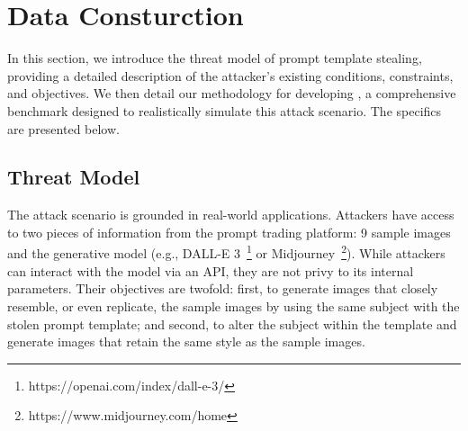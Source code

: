 

\section{Data Consturction}

In this section, we introduce the threat model of prompt template stealing, providing a detailed description of the attacker's existing conditions, constraints, and objectives. We then detail our methodology for developing \data, a comprehensive benchmark designed to realistically simulate this attack scenario.  The specifics are presented below.

\subsection{Threat Model} \label{sec_threat_model}
The attack scenario is grounded in real-world applications. Attackers have access to two pieces of information from the prompt trading platform: 9 sample images and the generative model (e.g., DALL-E 3~\footnote{https://openai.com/index/dall-e-3/} or Midjourney~\footnote{https://www.midjourney.com/home}). While attackers can interact with the model via an API, they are not privy to its internal parameters. Their objectives are twofold: first, to generate images that closely resemble, or even replicate, the sample images by using the same subject with the stolen prompt template; and second, to alter the subject within the template and generate images that retain the same style as the sample images.




